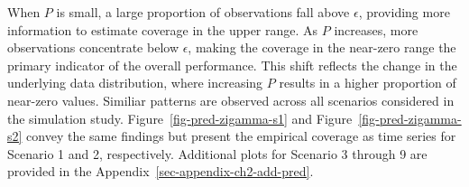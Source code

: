 \documentclass[
  letterpaper,
  double,
  12pt,
  1.0in]{beavtex}
\begin{document}
When \(P\) is small, a large proportion of observations fall above
\(\epsilon\), providing more information to estimate coverage in the
upper range. As \(P\) increases, more observations concentrate below
\(\epsilon\), making the coverage in the near-zero range the primary
indicator of the overall performance. This shift reflects the change in
the underlying data distribution, where increasing \(P\) results in a
higher proportion of near-zero values. Similiar patterns are observed
across all scenarios considered in the simulation study.
Figure~\ref{fig-pred-zigamma-s1} and Figure~\ref{fig-pred-zigamma-s2}
convey the same findings but present the empirical coverage as time
series for Scenario 1 and 2, respectively. Additional plots for Scenario
3 through 9 are provided in the
Appendix~\ref{sec-appendix-ch2-add-pred}.

\begin{table}

\caption{\label{tbl-pred-zigamma-s1}Empirical coverage of the $95\%$ predictive intervals for ZIGamma Scenario 1 (varying $P$ and $\epsilon$). Each row label indicates the combination of $P$ (zero-inflated probability) and $\epsilon$ (threshold value) used in the simulation. Reported values show overall empirical coverage, with decomposed coverage below and above the threshold.}


\end{table}%
\end{document}
